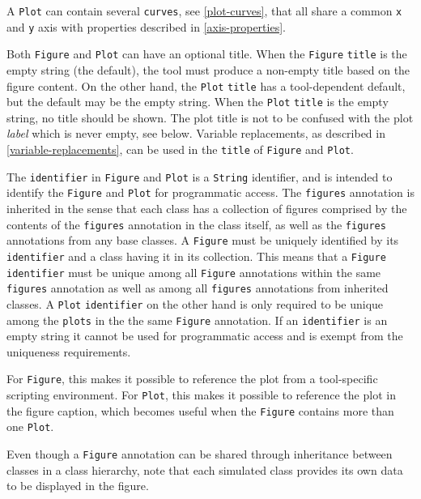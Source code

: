 A \lstinline!Plot! can contain several \lstinline!curves!, see \cref{plot-curves}, that all share a common \lstinline!x! and \lstinline!y! axis with properties described in \cref{axis-properties}.

Both \lstinline!Figure! and \lstinline!Plot! can have an optional title.
When the \lstinline!Figure! \lstinline!title! is the empty string (the default), the tool must produce a non-empty title based on the figure content.
On the other hand, the \lstinline!Plot! \lstinline!title! has a tool-dependent default, but the default may be the empty string.
When the \lstinline!Plot! \lstinline!title! is the empty string, no title should be shown.
The plot title is not to be confused with the plot \emph{label} which is never empty, see below.
Variable replacements, as described in \cref{variable-replacements}, can be used in the \lstinline!title! of \lstinline!Figure! and \lstinline!Plot!.

The \lstinline!identifier! in \lstinline!Figure! and \lstinline!Plot! is a \lstinline!String! identifier, and is intended to identify the \lstinline!Figure! and \lstinline!Plot! for programmatic access.
The \lstinline!figures! annotation is inherited in the sense that each class has a collection of figures comprised by the contents of the \lstinline!figures! annotation in the class itself, as well as the \lstinline!figures! annotations from any base classes.
A \lstinline!Figure! must be uniquely identified by its \lstinline!identifier! and a class having it in its collection.
This means that a \lstinline!Figure! \lstinline!identifier! must be unique among all \lstinline!Figure! annotations within the same \lstinline!figures! annotation as well as among all \lstinline!figures! annotations from inherited classes.
A \lstinline!Plot! \lstinline!identifier! on the other hand is only required to be unique among the \lstinline!plots! in the the same \lstinline!Figure! annotation.
If an \lstinline!identifier! is an empty string it cannot be used for programmatic access and is exempt from the uniqueness requirements.

\begin{nonnormative}
For \lstinline!Figure!, this makes it possible to reference the plot from a tool-specific scripting environment.
For \lstinline!Plot!, this makes it possible to reference the plot in the figure caption, which becomes useful when the \lstinline!Figure! contains more than one \lstinline!Plot!.
\end{nonnormative}

Even though a \lstinline!Figure! annotation can be shared through inheritance between classes in a class hierarchy, note that each simulated class provides its own data to be displayed in the figure.

